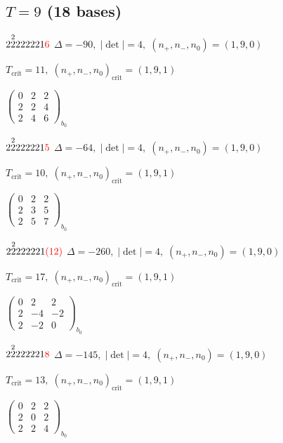 \documentclass[10pt]{article}
\begin{document}
\subsection*{$T = 9$ \quad (18 bases)}
\smallskip

$2\overset{2}{2}222221\textcolor{red}{6}$ \quad $\Delta=-90,\; |\det|=4,\; (n_+,n_-,n_0)=(1,9,0)$

\hspace{1em}$T_{\text{crit}}=11,\; (n_+,n_-,n_0)_{\text{crit}}=(1,9,1)$

\hspace{2em}$\left(\begin{smallmatrix}0 & 2 & 2 \\ 2 & 2 & 4 \\ 2 & 4 & 6\end{smallmatrix}\right)_{\!b_0}$

$2\overset{2}{2}222221\textcolor{red}{5}$ \quad $\Delta=-64,\; |\det|=4,\; (n_+,n_-,n_0)=(1,9,0)$

\hspace{1em}$T_{\text{crit}}=10,\; (n_+,n_-,n_0)_{\text{crit}}=(1,9,1)$

\hspace{2em}$\left(\begin{smallmatrix}0 & 2 & 2 \\ 2 & 3 & 5 \\ 2 & 5 & 7\end{smallmatrix}\right)_{\!b_0}$

$2\overset{2}{2}222221\textcolor{red}{(12)}$ \quad $\Delta=-260,\; |\det|=4,\; (n_+,n_-,n_0)=(1,9,0)$

\hspace{1em}$T_{\text{crit}}=17,\; (n_+,n_-,n_0)_{\text{crit}}=(1,9,1)$

\hspace{2em}$\left(\begin{smallmatrix}0 & 2 & 2 \\ 2 & -4 & -2 \\ 2 & -2 & 0\end{smallmatrix}\right)_{\!b_0}$

$2\overset{2}{2}222221\textcolor{red}{8}$ \quad $\Delta=-145,\; |\det|=4,\; (n_+,n_-,n_0)=(1,9,0)$

\hspace{1em}$T_{\text{crit}}=13,\; (n_+,n_-,n_0)_{\text{crit}}=(1,9,1)$

\hspace{2em}$\left(\begin{smallmatrix}0 & 2 & 2 \\ 2 & 0 & 2 \\ 2 & 2 & 4\end{smallmatrix}\right)_{\!b_0}$
\end{document}
